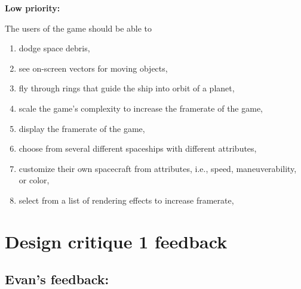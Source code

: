 \noindent \textbf{Low priority:}

The users of the game should be able to

\begin{multicols}{2}
\begin{enumerate}

  \item dodge space debris,

  \item see on-screen vectors for moving objects,

  \item fly through rings that guide the ship into orbit of a planet,

  \item scale the game's complexity to increase the framerate of the game,

  \item display the framerate of the game,

  \item choose from several different spaceships with different attributes,

  \item customize their own spacecraft from attributes, i.e., speed, maneuverability, or color,

  \item select from a list of rendering effects to increase framerate,

\end{enumerate}
\end{multicols}

\section*{Design critique 1 feedback}

\subsection*{Evan's feedback:}


